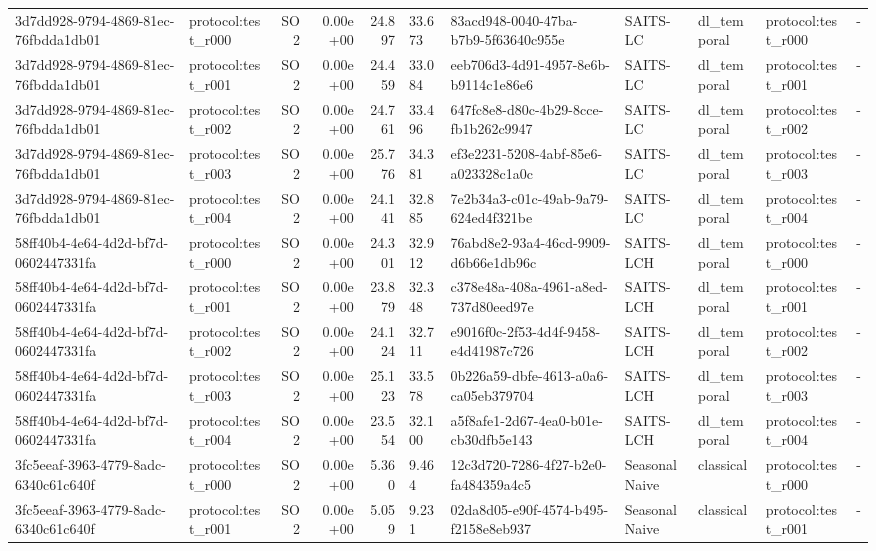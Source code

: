 \begin{table}[htbp]
\begin{tabular}{llrrr}
3d7dd928-9794-4869-81ec-76fbdda1db01 & protocol:test\_r000 & SO2 & 0.00e+00 & 24.897 & 33.673 & 83acd948-0040-47ba-b7b9-5f63640c955e & SAITS-LC & dl\_temporal & protocol:test\_r000 & - \\
3d7dd928-9794-4869-81ec-76fbdda1db01 & protocol:test\_r001 & SO2 & 0.00e+00 & 24.459 & 33.084 & eeb706d3-4d91-4957-8e6b-b9114c1e86e6 & SAITS-LC & dl\_temporal & protocol:test\_r001 & - \\
3d7dd928-9794-4869-81ec-76fbdda1db01 & protocol:test\_r002 & SO2 & 0.00e+00 & 24.761 & 33.496 & 647fc8e8-d80c-4b29-8cce-fb1b262c9947 & SAITS-LC & dl\_temporal & protocol:test\_r002 & - \\
3d7dd928-9794-4869-81ec-76fbdda1db01 & protocol:test\_r003 & SO2 & 0.00e+00 & 25.776 & 34.381 & ef3e2231-5208-4abf-85e6-a023328c1a0c & SAITS-LC & dl\_temporal & protocol:test\_r003 & - \\
3d7dd928-9794-4869-81ec-76fbdda1db01 & protocol:test\_r004 & SO2 & 0.00e+00 & 24.141 & 32.885 & 7e2b34a3-c01c-49ab-9a79-624ed4f321be & SAITS-LC & dl\_temporal & protocol:test\_r004 & - \\
58ff40b4-4e64-4d2d-bf7d-0602447331fa & protocol:test\_r000 & SO2 & 0.00e+00 & 24.301 & 32.912 & 76abd8e2-93a4-46cd-9909-d6b66e1db96c & SAITS-LCH & dl\_temporal & protocol:test\_r000 & - \\
58ff40b4-4e64-4d2d-bf7d-0602447331fa & protocol:test\_r001 & SO2 & 0.00e+00 & 23.879 & 32.348 & c378e48a-408a-4961-a8ed-737d80eed97e & SAITS-LCH & dl\_temporal & protocol:test\_r001 & - \\
58ff40b4-4e64-4d2d-bf7d-0602447331fa & protocol:test\_r002 & SO2 & 0.00e+00 & 24.124 & 32.711 & e9016f0c-2f53-4d4f-9458-e4d41987c726 & SAITS-LCH & dl\_temporal & protocol:test\_r002 & - \\
58ff40b4-4e64-4d2d-bf7d-0602447331fa & protocol:test\_r003 & SO2 & 0.00e+00 & 25.123 & 33.578 & 0b226a59-dbfe-4613-a0a6-ca05eb379704 & SAITS-LCH & dl\_temporal & protocol:test\_r003 & - \\
58ff40b4-4e64-4d2d-bf7d-0602447331fa & protocol:test\_r004 & SO2 & 0.00e+00 & 23.554 & 32.100 & a5f8afe1-2d67-4ea0-b01e-cb30dfb5e143 & SAITS-LCH & dl\_temporal & protocol:test\_r004 & - \\
3fc5eeaf-3963-4779-8adc-6340c61c640f & protocol:test\_r000 & SO2 & 0.00e+00 & 5.360 & 9.464 & 12c3d720-7286-4f27-b2e0-fa484359a4c5 & SeasonalNaive & classical & protocol:test\_r000 & - \\
3fc5eeaf-3963-4779-8adc-6340c61c640f & protocol:test\_r001 & SO2 & 0.00e+00 & 5.059 & 9.231 & 02da8d05-e90f-4574-b495-f2158e8eb937 & SeasonalNaive & classical & protocol:test\_r001 & - \\

\end{tabular}
\end{table}
